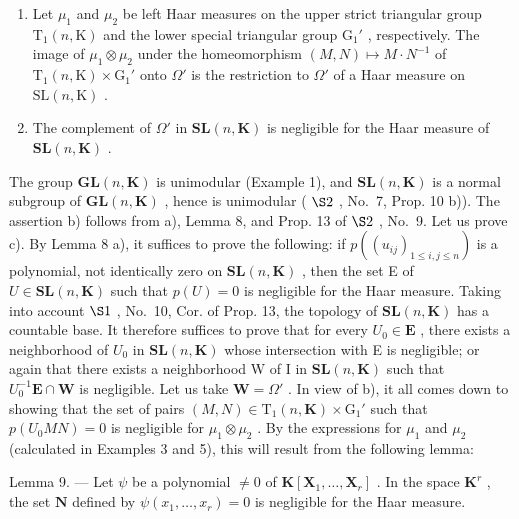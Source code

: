 \begin{enumerate}
\def\labelenumi{\alph{enumi})}
\setcounter{enumi}{1}
\item
  Let \(\mu_1\) and \(\mu_2\) be left Haar measures on the upper strict triangular group \(\mathrm{T}_1(n, \mathrm{K})\) and the lower special triangular group \(\mathrm{G}_1'\) , respectively. The image of \(\mu_1 \otimes \mu_2\) under the homeomorphism \((M, N) \mapsto M \cdot N^{-1}\) of \(\mathrm{T}_1(n, \mathrm{K}) \times \mathrm{G}_1'\) onto \(\Omega'\) is the restriction to \(\Omega'\) of a Haar measure on \(\mathrm{SL}(n, \mathrm{K})\) .
\item
  The complement of \(\Omega'\) in \(\mathbf{SL}(n,\mathbf{K})\) is negligible for the Haar measure of \(\mathbf{SL}(n,\mathbf{K})\) .
\end{enumerate}

The group \(\mathbf{GL}(n,\mathbf{K})\) is unimodular (Example 1), and \(\mathbf{SL}(n,\mathbf{K})\) is a normal subgroup of \(\mathbf{GL}(n,\mathbf{K})\) , hence is unimodular ( \(\S 2\) , No.~7, Prop. 10 b)). The assertion b) follows from a), Lemma 8, and Prop. 13 of \(\S 2\) , No.~9. Let us prove c). By Lemma 8 a), it suffices to prove the following: if \(p((u_{ij})_{1 \leqslant i,j \leqslant n})\) is a polynomial, not identically zero on \(\mathbf{SL}(n,\mathbf{K})\) , then the set E of \(U \in \mathbf{SL}(n,\mathbf{K})\) such that \(p(U) = 0\) is negligible for the Haar measure. Taking into account \(\S 1\) , No.~10, Cor. of Prop. 13, the topology of \(\mathbf{SL}(n,\mathbf{K})\) has a countable base. It therefore suffices to prove that for every \(U_0 \in \mathbf{E}\) , there exists a neighborhood of \(U_0\) in \(\mathbf{SL}(n,\mathbf{K})\) whose intersection with E is negligible; or again that there exists a neighborhood W of I in \(\mathbf{SL}(n,\mathbf{K})\) such that \(U_0^{-1}\mathbf{E} \cap \mathbf{W}\) is negligible. Let us take \(\mathbf{W} = \Omega'\) . In view of b), it all comes down to showing that the set of pairs \((M,N) \in \mathrm{T}_1(n,\mathbf{K}) \times \mathrm{G}_1'\) such that \(p(U_0MN) = 0\) is negligible for \(\mu_1 \otimes \mu_2\) . By the expressions for \(\mu_1\) and \(\mu_2\) (calculated in Examples 3 and 5), this will result from the following lemma:

Lemma 9. --- Let \(\psi\) be a polynomial \(\neq 0\) of \(\mathbf{K}[\mathbf{X}_1, \ldots, \mathbf{X}_r]\) . In the space \(\mathbf{K}^r\) , the set \(\mathbf{N}\) defined by \(\psi(x_1, \ldots, x_r) = 0\) is negligible for the Haar measure.

